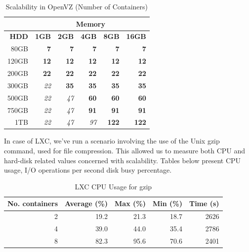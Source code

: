 \begin{table}[ht]
  \centering
  \begin{tabular}{|r|r|r|r|r|r|}
    \hline
     & \multicolumn{5}{|c|}{\textbf{Memory}} \\
    \hline
    \textbf{HDD} & \textbf{1GB} & \textbf{2GB} & \textbf{4GB} & \textbf{8GB} &
    \textbf{16GB} \\
    \hline
    80GB & \textbf{7} & \textbf{7} & \textbf{7} & \textbf{7} &
    \textbf{7} \\
    \hline
    120GB & \textbf{12} & \textbf{12} & \textbf{12} & \textbf{12} &
    \textbf{12} \\
    \hline
    200GB & \textbf{22} & \textbf{22} & \textbf{22} & \textbf{22} &
    \textbf{22} \\
    \hline
    300GB & \textit{22} & \textbf{35} & \textbf{35} & \textbf{35} &
    \textbf{35} \\
    \hline
    500GB & \textit{22} & \textit{47} & \textbf{60} & \textbf{60} &
    \textbf{60} \\
    \hline
    750GB & \textit{22} & \textit{47} & \textbf{91} & \textbf{91} &
    \textbf{91} \\
    \hline
    1TB & \textit{22} & \textit{47} & \textit{97} & \textbf{122} &
    \textbf{122} \\
    \hline
  \end{tabular}
  \caption{Scalability in OpenVZ (Number of Containers)}
  \label{table:virt-infra:openvz}
\end{table}

In case of LXC, we've run a scenario involving the use of the Unix gzip
command, used for file compression. This allowed us to measure both CPU and
hard-disk related values concerned with scalability. Tables below present CPU
usage, I/O operations per second disk busy percentage.

\begin{table}[ht]
  \centering
  \begin{tabular}{@{}rrrrr@{}}
    \toprule
    \textbf{No. containers} & \textbf{Average (\%)} & \textbf{Max (\%)} &
    \textbf{Min (\%)} & \textbf{Time (s)} \\
    \midrule
    2 & 19.2 & 21.3 & 18.7 & 2626 \\
    4 & 39.0 & 44.0 & 35.4 & 2786 \\
    8 & 82.3 & 95.6 & 70.6 & 2401 \\
    \bottomrule
  \end{tabular}
  \caption{LXC CPU Usage for gzip}
  \label{table:virt-infra:lxc-cpu}
\end{table}

